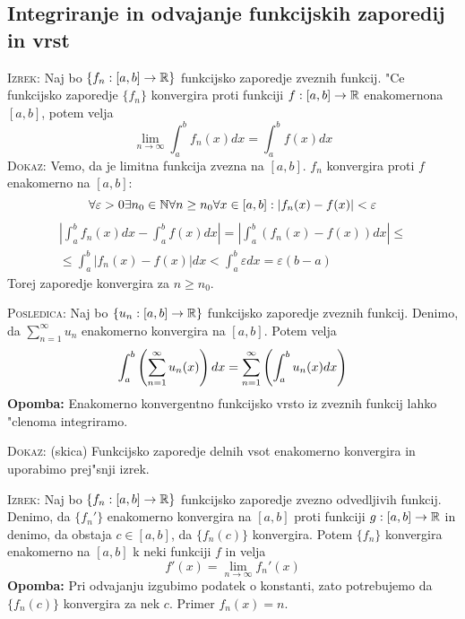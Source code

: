 \subsection{Integriranje in odvajanje funkcijskih zaporedij in vrst}
\textsc{Izrek:} Naj bo $\{ f_n : [a, b] \to \mathbb{R} \}$ funkcijsko zaporedje zveznih funkcij. "Ce funkcijsko zaporedje $\{ f_n \}$ konvergira proti funkciji $f: [a, b] \to \mathbb{R}$ enakomernona $[a, b]$, potem velja
\begin{equation*}
\lim_{n \to \infty} \int_a^b f_n (x) dx = \int_a^b f(x) dx
\end{equation*}
\textsc{Dokaz:} Vemo, da je limitna funkcija zvezna na $[a, b]$. $f_n$ konvergira proti $f$ enakomerno na $[a, b]$:
\begin{equation*}
\forall \varepsilon > 0 \exists n_0 \in \mathbb{N} \forall n \geq n_0 \forall x \in [a, b] : |f_n(x) - f(x)| < \varepsilon
\end{equation*}
\begin{multline*}
\left| \int_a^b f_n (x) dx - \int_a^b f(x) dx \right| = \left| \int_a^b (f_n(x) - f(x)) dx \right| \leq \\
\leq \int_a^b | f_n(x) - f(x) | dx < \int_a^b \varepsilon dx = \varepsilon (b-a)
\end{multline*}
Torej zaporedje konvergira za $n \geq n_0$.

\textsc{Posledica:} Naj bo $\{ u_n : [a, b] \to \mathbb{R} \}$ funkcijsko zaporedje zveznih funkcij. Denimo, da $\sum_{n=1}^\infty u_n$ enakomerno konvergira na $[a, b]$. Potem velja
\begin{equation*}
\int_a^b \left( \sum_{n = 1}^{\infty} u_n (x) \right) dx = \sum_{n = 1}^{\infty} \left( \int_a^b u_n (x) dx \right)
\end{equation*}
\textbf{Opomba:} Enakomerno konvergentno funkcijsko vrsto iz zveznih funkcij lahko "clenoma integriramo.

\textsc{Dokaz:} (skica) Funkcijsko zaporedje delnih vsot enakomerno konvergira in uporabimo prej"snji izrek.

\textsc{Izrek:} Naj bo $\{ f_n : [a, b] \to \mathbb{R} \}$ funkcijsko zaporedje zvezno odvedljivih funkcij. Denimo, da $\{ f_n' \}$ enakomerno konvergira na $[a, b]$ proti funkciji $g: [a, b] \to \mathbb{R}$ in denimo, da obstaja $c \in [a, b]$, da $\{ f_n (c) \}$ konvergira. Potem $\{ f_n \}$ konvergira enakomerno na $[a, b]$ k neki funkciji $f$ in velja
\begin{equation*}
f' (x) = \lim_{n \to \infty} f_n'(x)
\end{equation*}
\textbf{Opomba:} Pri odvajanju izgubimo podatek o konstanti, zato potrebujemo da $\{ f_n(c) \}$ konvergira za nek $c$. Primer $f_n(x) = n$.


